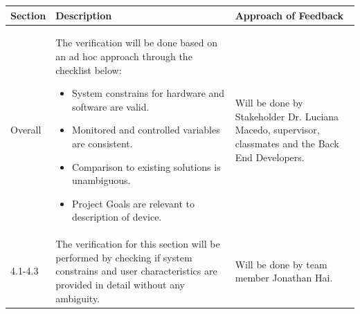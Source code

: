 \documentclass[12pt, titlepage]{article}
\begin{document}
\begin{center}
  \begin{tabular}{|m{2cm}|m{9cm}|m{4cm}|}
    \hline
    \textbf{Section }                                 & \textbf{Description}                                                                                                                                                                  & \textbf{Approach \newline of Feedback}
    \\
    \hline
    Overall                        & The verification will be done based on an ad hoc approach through the checklist below: \begin{itemize}
                                                                                                                                                       \item[\ding{111}] System constrains for hardware and software are valid.
                                                                                                                                                       \item[\ding{111}] Monitored and controlled variables are consistent.
                                                                                                                                                       \item[\ding{111}] Comparison to existing solutions is unambiguous.
                                                                                                                                                       \item[\ding{111}] Project Goals are relevant to description of device.
                                                                                                                                                     \end{itemize}                                                                                & Will be done by Stakeholder Dr. Luciana Macedo, supervisor, classmates and the Back End Developers. \\
    \hline
   4.1-4.3                      & The verification for this section will be performed by checking if system constrains and user characteristics are provided in detail without any ambiguity.                                       & Will be done by team member Jonathan Hai.                                                    \\

\end{tabular}
\end{center}
\end{document}

